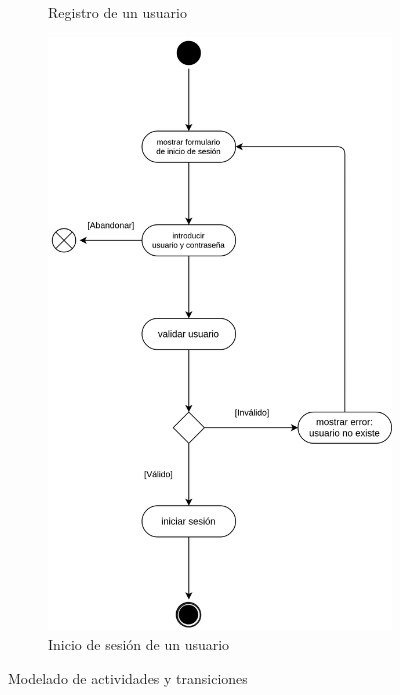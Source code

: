 \begin{figure}[h]
\begin{subfigure}{0.45\textwidth}
                    \caption{Registro de un usuario}
                    \label{fig:registro-usuario}
                \end{subfigure}
                \hfill
                \begin{subfigure}{0.45\textwidth}
                    \centering
                    \includegraphics[scale=0.15]{images/Diagramas/Actividades y transiciones 2.png}
                    \caption{Inicio de sesión de un usuario}
                    \label{fig:inicio-usuario}
                \end{subfigure}
                \caption{Modelado de actividades y transiciones}
                \label{fig:actividades-transiciones}
            \end{figure}
            
